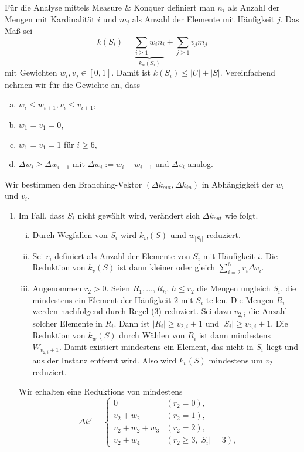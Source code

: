   Für die Analyse mittels Measure \& Konquer definiert man \(n_i\) als Anzahl der Mengen mit Kardinalität \(i\) und \(m_j\) als Anzahl der Elemente mit Häufigkeit \(j\). Das Maß sei
  \[ k(S_i) = \underbrace{ \sum_{i \geq 1} w_in_i }_{k_w(S_i)} + \sum_{j \geq 1} v_jm_j \]
  mit Gewichten \(w_i, v_j \in [0,1]\). Damit ist \(k(S_i) \leq |U| + |S|\). Vereinfachend nehmen wir für die Gewichte an, dass
  \begin{enumerate}[(a)]
   \item \(w_i \leq w_{i+1}, v_i \leq v_{i+1}\),
   \item \(w_1 = v_1 = 0\),
   \item \(w_1 = v_1 = 1\) für \(i \geq 6\),
   \item \(\Delta w_i \geq \Delta w_{i+1}\) mit \(\Delta w_i := w_i - w_{i-1}\) und \(\Delta v_i\) analog.
  \end{enumerate}
  Wir bestimmen den Branching-Vektor \( (\Delta k_{out}, \Delta k_{in}) \) in Abhängigkeit der \(w_i\) und \(v_i\).
  \begin{enumerate}[(1)]
   \item Im Fall, dass \(S_i\) nicht gewählt wird, verändert sich \(\Delta k_{out}\) wie folgt.
          \begin{enumerate}[(i)]
            \item Durch Wegfallen von \(S_i\) wird \(k_w(S)\) umd \(w_{|S_i|}\) reduziert.
            \item Sei \(r_i\) definiert als Anzahl der Elemente von \(S_i\) mit Häufigkeit \(i\). Die Reduktion von \(k_v(S)\) ist dann kleiner oder gleich \(\sum_{i=2}^6 r_i \Delta v_i\).
            \item Angenommen \(r_2 > 0\). Seien \(R_1, ..., R_h\), \(h \leq r_2\) die Mengen ungleich \(S_i\), die mindestens ein Element der Häufigkeit 2 mit \(S_i\) teilen. Die Mengen \(R_i\) werden nachfolgend durch Regel (3) reduziert. Sei dazu \(v_{2,i}\) die Anzahl solcher Elemente in \(R_i\). Dann ist \(|R_i| \geq v_{2,i}+1\) und \(|S_i| \geq v_{2,i} + 1\). Die Reduktion von \(k_w(S)\) durch Wählen von \(R_i\) ist dann mindestens \(W_{v_{2,i}+1}\). Damit existiert mindestens ein Element, das nicht in \(S_i\) liegt und aus der Instanz entfernt wird. Also wird \(k_v(S)\) mindestens um \(v_2\) reduziert.
          \end{enumerate}
          Wir erhalten eine Reduktions von mindestens
          \[
           \Delta k' =
           \begin{cases}
             0 & (r_2 = 0), \\
             v_2 + w_2 & (r_2 = 1), \\
             v_2 + w_2 + w_3 & (r_2 = 2), \\
             v_2 + w_4 & (r_2 \geq 3, |S_i| = 3),
           \end{cases}
          \]

  \end{enumerate}


